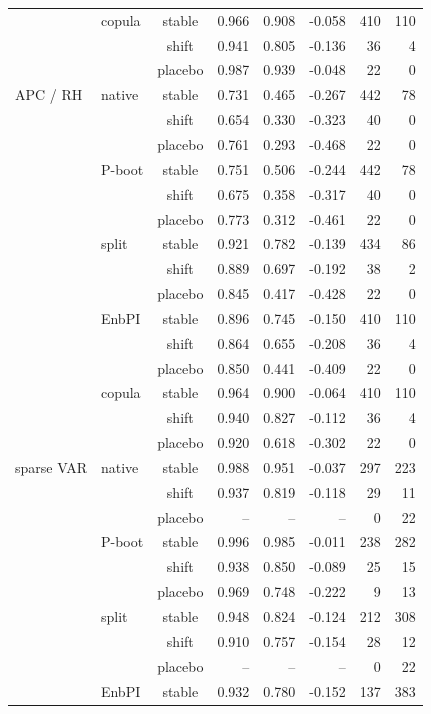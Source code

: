 {\begin{longtable}{@{}llcrrrrr@{}}
 & copula & stable & 0.966 & 0.908 & -0.058 & 410 & 110 \\
 &  & shift & 0.941 & 0.805 & -0.136 & 36 & 4 \\
 &  & placebo & 0.987 & 0.939 & -0.048 & 22 & 0 \\
\addlinespace[2pt]
APC / RH & native & stable & 0.731 & 0.465 & -0.267 & 442 & 78 \\
 &  & shift & 0.654 & 0.330 & -0.323 & 40 & 0 \\
 &  & placebo & 0.761 & 0.293 & -0.468 & 22 & 0 \\
 & P-boot & stable & 0.751 & 0.506 & -0.244 & 442 & 78 \\
 &  & shift & 0.675 & 0.358 & -0.317 & 40 & 0 \\
 &  & placebo & 0.773 & 0.312 & -0.461 & 22 & 0 \\
 & split & stable & 0.921 & 0.782 & -0.139 & 434 & 86 \\
 &  & shift & 0.889 & 0.697 & -0.192 & 38 & 2 \\
 &  & placebo & 0.845 & 0.417 & -0.428 & 22 & 0 \\
 & EnbPI & stable & 0.896 & 0.745 & -0.150 & 410 & 110 \\
 &  & shift & 0.864 & 0.655 & -0.208 & 36 & 4 \\
 &  & placebo & 0.850 & 0.441 & -0.409 & 22 & 0 \\
 & copula & stable & 0.964 & 0.900 & -0.064 & 410 & 110 \\
 &  & shift & 0.940 & 0.827 & -0.112 & 36 & 4 \\
 &  & placebo & 0.920 & 0.618 & -0.302 & 22 & 0 \\
\addlinespace[2pt]
sparse VAR & native & stable & 0.988 & 0.951 & -0.037 & 297 & 223 \\
 &  & shift & 0.937 & 0.819 & -0.118 & 29 & 11 \\
 &  & placebo & -- & -- & -- & 0 & 22 \\
 & P-boot & stable & 0.996 & 0.985 & -0.011 & 238 & 282 \\
 &  & shift & 0.938 & 0.850 & -0.089 & 25 & 15 \\
 &  & placebo & 0.969 & 0.748 & -0.222 & 9 & 13 \\
 & split & stable & 0.948 & 0.824 & -0.124 & 212 & 308 \\
 &  & shift & 0.910 & 0.757 & -0.154 & 28 & 12 \\
 &  & placebo & -- & -- & -- & 0 & 22 \\
 & EnbPI & stable & 0.932 & 0.780 & -0.152 & 137 & 383 \\

\end{longtable}}

